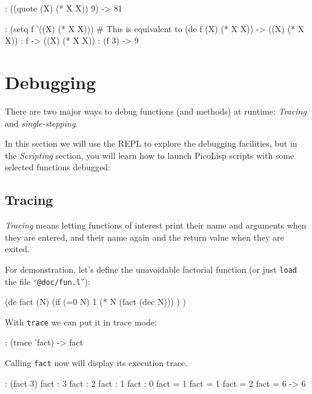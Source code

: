 \begin{wideverbatim}
: ((quote (X) (* X X)) 9)
-> 81
\end{wideverbatim}


\begin{wideverbatim}
: (setq f '((X) (* X X)))  # This is equivalent to (de f (X) (* X X))
-> ((X) (* X X))
: f
-> ((X) (* X X))
: (f 3)
-> 9
\end{wideverbatim}

 
\section{Debugging}
\label{sec:tut-debugging}


There are two major ways to debug functions (and methods) at runtime:
\emph{Tracing} and \emph{single-stepping}.

In this section we will use the REPL to explore the debugging
facilities, but in the \emph{Scripting} section, you will learn
how to launch PicoLisp scripts with some selected functions debugged:



 
\subsection{Tracing}
\label{sec:tut-tracing}


\emph{Tracing} means letting functions of interest print their name and
arguments when they are entered, and their name again and the return
value when they are exited.

For demonstration, let's define the unavoidable factorial function (or
just \texttt{load} the file ``\texttt{@doc/fun.l}''):


\begin{wideverbatim}
(de fact (N)
   (if (=0 N)
      1
      (* N (fact (dec N))) ) )
\end{wideverbatim}

With \texttt{trace} we can put it in trace mode:


\begin{wideverbatim}
: (trace 'fact)
-> fact
\end{wideverbatim}

Calling \texttt{fact} now will display its execution trace.


\begin{wideverbatim}
: (fact 3)
 fact : 3
  fact : 2
   fact : 1
    fact : 0
    fact = 1
   fact = 1
  fact = 2
 fact = 6
-> 6
\end{wideverbatim}

